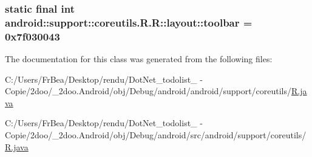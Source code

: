 \hypertarget{classandroid_1_1support_1_1coreutils_1_1_r_1_1layout_f07310f34327d6e4ee4925a0b1ccb8b6}{
\subsubsection[{toolbar}]{\setlength{\rightskip}{0pt plus 5cm}static final int android::support::coreutils.R.R::layout::toolbar = 0x7f030043}}
\label{classandroid_1_1support_1_1coreutils_1_1_r_1_1layout_f07310f34327d6e4ee4925a0b1ccb8b6}




The documentation for this class was generated from the following files:\begin{CompactItemize}
\item 
C:/Users/FrBea/Desktop/rendu/DotNet\_\-todolist\_ - Copie/2doo/\_\-2doo.Android/obj/Debug/android/android/support/coreutils/\hyperlink{android_2support_2coreutils_2_r_8java}{R.java}\item 
C:/Users/FrBea/Desktop/rendu/DotNet\_\-todolist\_ - Copie/2doo/\_\-2doo.Android/obj/Debug/android/src/android/support/coreutils/\hyperlink{src_2android_2support_2coreutils_2_r_8java}{R.java}\end{CompactItemize}
